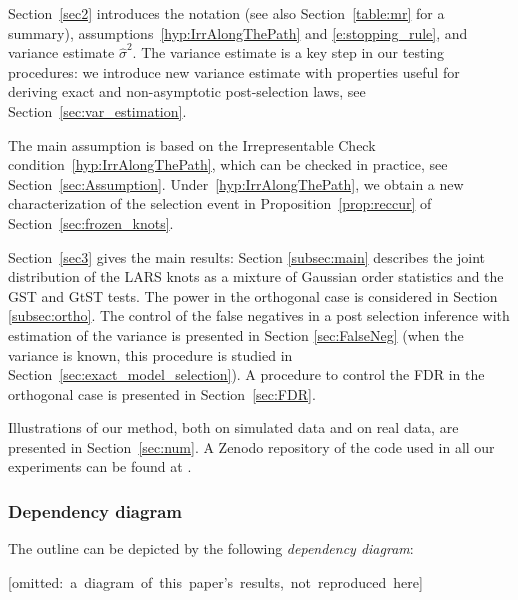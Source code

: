 \documentclass[final,numbib]{imaiai}%
\numberwithin{equation}{section}
\renewcommand{\hat}{\widehat}
\newcommand{\<}{\langle}
\renewcommand{\>}{\rangle}
\newcommand{\1}{\mathds{1}}
\begin{document}
{{Section~\ref{sec2} introduces the notation (see also Section~\ref{table:mr} for a summary), assumptions~\eqref{hyp:IrrAlongThePath} and \eqref{e:stopping_rule}, and variance estimate $\hat \sigma^2$.
The variance estimate is a key step in our testing procedures: we introduce new variance estimate with properties useful for deriving exact and non-asymptotic post-selection laws, see Section~\ref{sec:var_estimation}.

The main assumption is based on the Irrepresentable Check condition~\eqref{hyp:IrrAlongThePath}, which can be checked in practice, see Section~\ref{sec:Assumption}.
Under~\eqref{hyp:IrrAlongThePath}, we obtain a new characterization of the selection event in Proposition~\ref{prop:reccur} of Section~\ref{sec:frozen_knots}.


Section~\ref{sec3} gives the main results:  Section \ref{subsec:main} describes the joint distribution of the LARS knots as a mixture  of Gaussian order statistics and the GST and GtST tests.
The power in the orthogonal case is considered in Section \ref{subsec:ortho}.
The control of the  false negatives  in a post selection  inference with estimation of the variance  is presented in Section \ref{sec:FalseNeg} (when the variance is known, this procedure is studied in Section~\ref{sec:exact_model_selection}).
A procedure  to control the FDR in the orthogonal case is presented  in Section~\ref{sec:FDR}.

Illustrations of our method, both on simulated data and on real data, are presented in Section~\ref{sec:num}.
A Zenodo repository of the code used in all our experiments can be found at \cite{yohann_de_castro_2021_5079768}.


\pagebreak

\subsubsection{Dependency diagram}  
The outline can be depicted by the following {\it dependency diagram}:

\vspace*{0.5cm}


\hspace*{-1cm}
\mbox{[omitted: a diagram of this paper's results, not reproduced here]}

\vspace*{0.3cm}


}}
\end{document}
